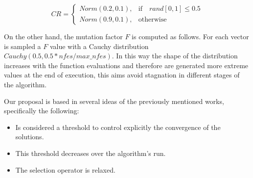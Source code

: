 \begin{equation} \label{eqn:cr}
CR = 
\begin{cases}
     Norm(0.2, 0.1),& \text{if} \quad rand[0,1] \leq 0.5  \\
     Norm(0.9, 0.1),              & \text{otherwise}
\end{cases}
\end{equation}


On the other hand, the mutation factor $F$ is computed as follows.
%
For each vector is sampled a $F$ value with a Cauchy distribution $Cauchy(0.5, 0.5*nfes/max\_nfes)$.
%
In this way the shape of the distribution increases with the function evaluations and therefore are generated more extreme values at the end of execution, this aims avoid stagnation in different stages of the algorithm.
%


Our proposal is based in several ideas of the previously mentioned works, specifically the following:
\begin{itemize}
\item Is considered a threshold to control explicitly the convergence of the solutions.
\item This threshold decreases over the algorithm's run.
\item The selection operator is relaxed. 
\end{itemize}

